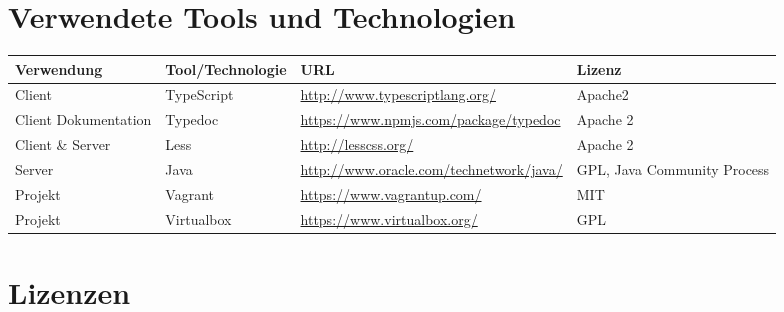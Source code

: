 \begin{landscape}
	\section{Verwendete Tools und Technologien}
	
		\begin{tabularx}{\linewidth}{| l | l | l | X |}
			\hline
			\textbf{Verwendung} & \textbf{Tool/Technologie} & \textbf{URL} & \textbf{Lizenz} \\
			\hline \hline
			Client & TypeScript & \url{http://www.typescriptlang.org/} & Apache2 \\\hline
			Client Dokumentation & Typedoc & \url{https://www.npmjs.com/package/typedoc} &  Apache 2 \\ \hline
			Client \& Server & Less & \url{http://lesscss.org/} &  Apache 2 \\ \hline
			Server & Java & \url{http://www.oracle.com/technetwork/java/} & GPL, Java Community Process\\ \hline
			Projekt & Vagrant & \url{https://www.vagrantup.com/} & MIT \\ \hline
			Projekt & Virtualbox & \url{https://www.virtualbox.org/} &  GPL \\ \hline
		\end{tabularx}
		
			
	\section{Lizenzen}
	\label{sec:licenses}
	
	\newcommand{\addLicense}[6]{
		#1 & #2 & \url{#3} & #4 & #5 & #6	\\
		\hline
	}


\end{landscape}
